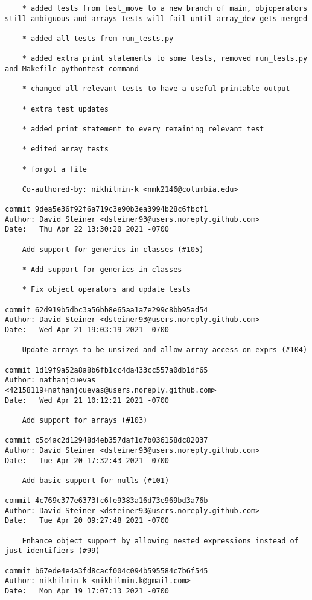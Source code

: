 \documentclass{article}
\begin{document}
\begin{verbatim}
    * added tests from test_move to a new branch of main, objoperators still ambiguous and arrays tests will fail until array_dev gets merged
    
    * added all tests from run_tests.py
    
    * added extra print statements to some tests, removed run_tests.py and Makefile pythontest command
    
    * changed all relevant tests to have a useful printable output
    
    * extra test updates
    
    * added print statement to every remaining relevant test
    
    * edited array tests
    
    * forgot a file
    
    Co-authored-by: nikhilmin-k <nmk2146@columbia.edu>

commit 9dea5e36f92f6a719c3e90b3ea3994b28c6fbcf1
Author: David Steiner <dsteiner93@users.noreply.github.com>
Date:   Thu Apr 22 13:30:20 2021 -0700

    Add support for generics in classes (#105)
    
    * Add support for generics in classes
    
    * Fix object operators and update tests

commit 62d919b5dbc3a56bb8e65aa1a7e299c8bb95ad54
Author: David Steiner <dsteiner93@users.noreply.github.com>
Date:   Wed Apr 21 19:03:19 2021 -0700

    Update arrays to be unsized and allow array access on exprs (#104)

commit 1d19f9a52a8a8b6fb1cc4da433cc557a0db1df65
Author: nathanjcuevas <42158119+nathanjcuevas@users.noreply.github.com>
Date:   Wed Apr 21 10:12:21 2021 -0700

    Add support for arrays (#103)

commit c5c4ac2d12948d4eb357daf1d7b036158dc82037
Author: David Steiner <dsteiner93@users.noreply.github.com>
Date:   Tue Apr 20 17:32:43 2021 -0700

    Add basic support for nulls (#101)

commit 4c769c377e6373fc6fe9383a16d73e969bd3a76b
Author: David Steiner <dsteiner93@users.noreply.github.com>
Date:   Tue Apr 20 09:27:48 2021 -0700

    Enhance object support by allowing nested expressions instead of just identifiers (#99)

commit b67ede4e4a3fd8cacf004c094b595584c7b6f545
Author: nikhilmin-k <nikhilmin.k@gmail.com>
Date:   Mon Apr 19 17:07:13 2021 -0700


\end{verbatim}
\end{document}
